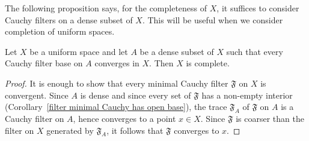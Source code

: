 The following proposition says, for the completeness of $X$, it suffices to consider Cauchy filters on a dense subset of $X$. This will be useful when we consider completion of uniform spaces.
\begin{proposition}\label{complete space iff Cauchy filter on dense subset}
Let $X$ be a uniform space and let $A$ be a dense subset of $X$ such that every Cauchy filter base on $A$ converges in $X$. Then $X$ is complete.
\end{proposition}
\begin{proof}
It is enough to show that every minimal Cauchy filter $\mathfrak{F}$ on $X$ is convergent. Since $A$ is dense and since every set of $\mathfrak{F}$ has a non-empty interior (Corollary~\ref{filter minimal Cauchy has open base}), the trace $\mathfrak{F}_A$ of $\mathfrak{F}$ on $A$ is a Cauchy filter on $A$, hence converges to a point $x\in X$. Since $\mathfrak{F}$ is coarser than the filter on $X$ generated by $\mathfrak{F}_A$, it follows that $\mathfrak{F}$ converges to $x$.
\end{proof}
